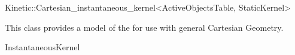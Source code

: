 

\begin{ccRefClass}{Kinetic::Cartesian_instantaneous_kernel<ActiveObjectsTable, StaticKernel>}  %


\ccDefinition
  
This class provides a model of the  for use with general Cartesian Geometry.


\ccIsModel

InstantaneousKernel

\end{ccRefClass}


